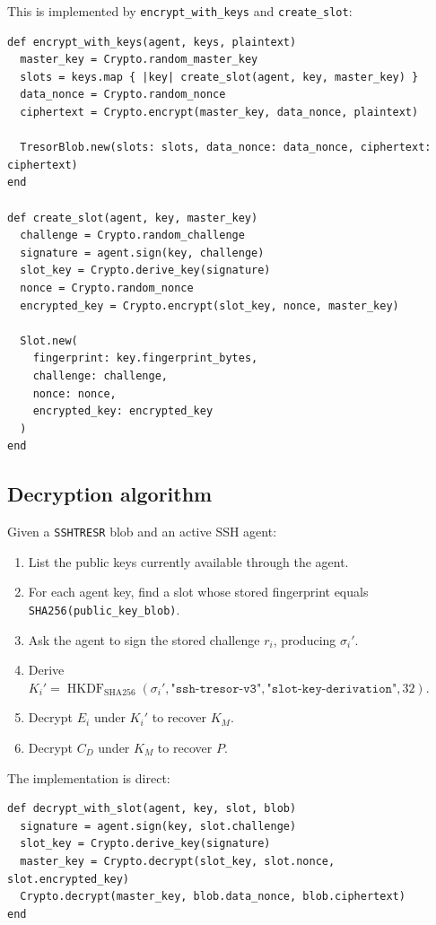 \documentclass[11pt]{article}
\theoremstyle{definition}
\theoremstyle{plain}
\newcommand{\Tresor}{\texttt{SSHTRESR}}
\newcommand{\HKDF}{\operatorname{HKDF}}
\begin{document}
This is implemented by \texttt{encrypt\_with\_keys} and \texttt{create\_slot}:

\begin{lstlisting}[style=rubycode,caption={Envelope encryption and slot creation from lib/ssh\_tresor/tresor.rb.}]
def encrypt_with_keys(agent, keys, plaintext)
  master_key = Crypto.random_master_key
  slots = keys.map { |key| create_slot(agent, key, master_key) }
  data_nonce = Crypto.random_nonce
  ciphertext = Crypto.encrypt(master_key, data_nonce, plaintext)

  TresorBlob.new(slots: slots, data_nonce: data_nonce, ciphertext: ciphertext)
end

def create_slot(agent, key, master_key)
  challenge = Crypto.random_challenge
  signature = agent.sign(key, challenge)
  slot_key = Crypto.derive_key(signature)
  nonce = Crypto.random_nonce
  encrypted_key = Crypto.encrypt(slot_key, nonce, master_key)

  Slot.new(
    fingerprint: key.fingerprint_bytes,
    challenge: challenge,
    nonce: nonce,
    encrypted_key: encrypted_key
  )
end
\end{lstlisting}

\subsection{Decryption algorithm}

Given a \Tresor{} blob and an active SSH agent:

\begin{enumerate}[leftmargin=*]
  \item List the public keys currently available through the agent.
  \item For each agent key, find a slot whose stored fingerprint equals \texttt{SHA256(public\_key\_blob)}.
  \item Ask the agent to sign the stored challenge $r_i$, producing $\sigma_i'$.
  \item Derive $K_i'=\HKDF_{\mathrm{SHA256}}(\sigma_i',\texttt{"ssh-tresor-v3"},\texttt{"slot-key-derivation"},32)$.
  \item Decrypt $E_i$ under $K_i'$ to recover $K_M$.
  \item Decrypt $C_D$ under $K_M$ to recover $P$.
\end{enumerate}

The implementation is direct:

\begin{lstlisting}[style=rubycode,caption={Slot-based decryption from lib/ssh\_tresor/tresor.rb.}]
def decrypt_with_slot(agent, key, slot, blob)
  signature = agent.sign(key, slot.challenge)
  slot_key = Crypto.derive_key(signature)
  master_key = Crypto.decrypt(slot_key, slot.nonce, slot.encrypted_key)
  Crypto.decrypt(master_key, blob.data_nonce, blob.ciphertext)
end
\end{lstlisting}
\end{document}
